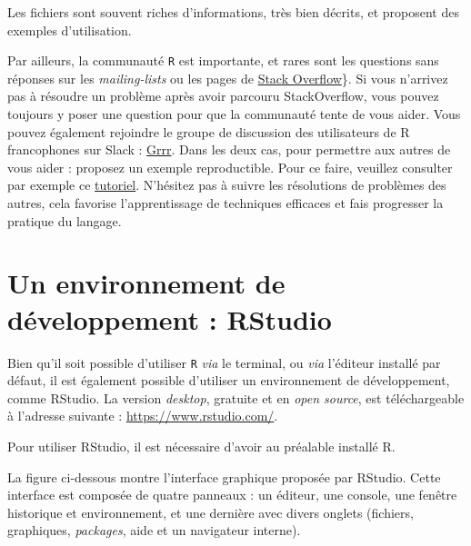\documentclass[
  11pt,
]{book}
\numberwithin{equation}{section}
\numberwithin{countremarque}{section}
\begin{document}
Les fichiers sont souvent riches d'informations, très bien décrits, et proposent des exemples d'utilisation.

Par ailleurs, la communauté \texttt{R} est importante, et rares sont les questions sans réponses sur les \emph{mailing-lists} ou les pages de \href{http://stackoverflow.com/questions/tagged/r}{Stack Overflow}\}. Si vous n'arrivez pas à résoudre un problème après avoir parcouru StackOverflow, vous pouvez toujours y poser une question pour que la communauté tente de vous aider. Vous pouvez également rejoindre le groupe de discussion des utilisateurs de R francophones sur Slack : \href{https://r-grrr.slack.com/}{Grrr}. Dans les deux cas, pour permettre aux autres de vous aider : proposez un exemple reproductible. Pour ce faire, veuillez consulter par exemple ce \href{https://www.tidyverse.org/help/}{tutoriel}. N'hésitez pas à suivre les résolutions de problèmes des autres, cela favorise l'apprentissage de techniques efficaces et fais progresser la pratique du langage.

\hypertarget{un-environnement-de-duxe9veloppement-rstudio}{%
\section{Un environnement de développement : RStudio}\label{un-environnement-de-duxe9veloppement-rstudio}}

Bien qu'il soit possible d'utiliser \texttt{R} \emph{via} le terminal, ou \emph{via} l'éditeur installé par défaut, il est également possible d'utiliser un environnement de développement, comme RStudio. La version \emph{desktop}, gratuite et en \emph{open source}, est téléchargeable à l'adresse suivante : \url{https://www.rstudio.com/}.

Pour utiliser RStudio, il est nécessaire d'avoir au préalable installé R.

La figure ci-dessous montre l'interface graphique proposée par RStudio. Cette interface est composée de quatre panneaux : un éditeur, une console, une fenêtre historique et environnement, et une dernière avec divers onglets (fichiers, graphiques, \emph{packages}, aide et un navigateur interne).
\end{document}
